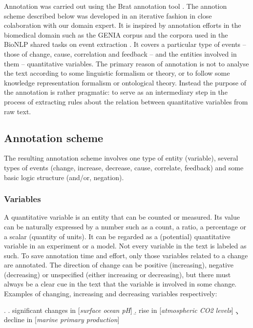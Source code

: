 \documentclass[10pt, a4paper]{article}
\begin{document}
Annotation was carried out using the Brat annotation tool \cite{stenetorp2012}.
The annotion scheme described below was developed in an iterative fashion in close colaboration with our domain expert.
It is inspired by annotation efforts in the biomedical domain such as the GENIA corpus \cite{Kim2003GENIA} and the corpora used in the BioNLP shared tasks on event extraction \cite{Kim2009Overview}.
It covers a particular type of events -- those of change, cause, correlation and feedback -- and the entities involved in them -- quantitative variables.
The primary reason of annotation is not to analyse the text according to some linguistic formalism or theory, or to follow some knowledge representation formalism or ontological theory.
Instead the purpose of the annotation is rather pragmatic: to serve as an intermediary step in the process of extracting rules about the relation between quantitative variables from raw text.      
 
\subsection{Annotation scheme}

The resulting annotation scheme involves one type of entity (variable), several types of events (change, increase, decrease, cause, correlate, feedback) and some basic logic structure (and/or, negation).  


\subsubsection{Variables}

A quantitative variable is an entity that can be counted or measured.
Its value can be naturally expressed by a number such as a count, a ratio, a percentage or a scalar (quantity of units).
It can be regarded as a (potential) quantitative variable in an experiment or a model. 
Not every variable in the text is labeled as such.
To save annotation time and effort, only those variables related to a change are annotated.
The  direction of change can be positive (increasing), negative (decreasing) or unspecified (either increasing or decreasing), but there must always be a clear cue in the text that the variable is involved in some change. 
Examples of changing, increasing and decreasing variables respectively:

\ex.
  \a. significant changes in [\emph{surface ocean pH}]
  \b. rise in [\emph{atmospheric CO2 levels}]
  \c. decline in [\emph{marine primary production}]
\end{document}
